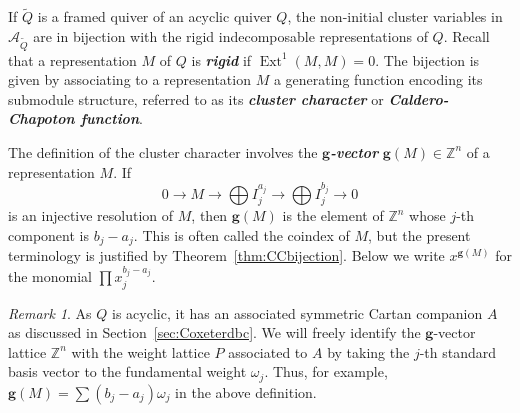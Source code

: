 \documentclass[12pt]{amsart}
\newcommand{\saySS}[1]{\say[SS]{\color{blue}{\bf SS:}\;#1}}
\newcommand{\sayDR}[1]{\say[DR]{\color{red}{\bf DR:}\;#1}}
\newcommand{\newword}[1]{\textbf{\emph{#1}}}
\newcommand{\cA}{\mathcal{A}}
\newcommand{\ZZ}{\mathbb{Z}}
\newcommand{\bfg}{\mathbf{g}}
\newcommand{\grep}{\bfg}
\DeclareMathOperator{\Ext}{Ext}
\newcommand{\Qrep}{M}
\theoremstyle{remark}
\newtheorem{remark}[theorem]{Remark}
\numberwithin{equation}{section}
\numberwithin{figure}{section}
\begin{document}
If $\widetilde{Q}$ is a framed quiver of an acyclic quiver $Q$, the non-initial cluster variables in $\cA_{\widetilde{Q}}$ are in bijection with the rigid indecomposable representations of $Q$. 
Recall that a representation $M$ of $Q$ is \newword{rigid} if $\Ext^1(M,M) = 0$. 
The bijection is given by associating to a representation $M$ a generating function encoding its submodule structure, referred to as its \newword{cluster character} or \newword{Caldero-Chapoton function}.

The definition of the cluster character involves the \newword{$\bfg$-vector} $\grep(\Qrep)\in\ZZ^n$ of a representation $\Qrep$. %
If
\[
  0 \to \Qrep \to \bigoplus I_j^{a_j} \to \bigoplus I_j^{b_j} \to 0
\]
is an injective resolution of $M$, then $\grep(\Qrep)$ is the element of $\ZZ^n$ whose $j$-th component is $b_j - a_j$. This is often called the coindex of $M$, but the present terminology is justified by Theorem~\ref{thm:CCbijection}. 
Below we write $x^{\grep(\Qrep)}$ for the monomial $\prod x_j^{b_j - a_j}$.

\begin{remark}
As $Q$ is acyclic, it has an associated symmetric Cartan companion $A$ as discussed in Section~\ref{sec:Coxeterdbc}. We will freely identify the $\bfg$-vector lattice $\ZZ^n$ with the weight lattice $P$ associated to $A$ by taking the $j$-th standard basis vector to the fundamental weight $\omega_j$. Thus, for example, $\grep(\Qrep) = \sum (b_j - a_j)\omega_j$ in the above definition. 
\end{remark}
\end{document}
